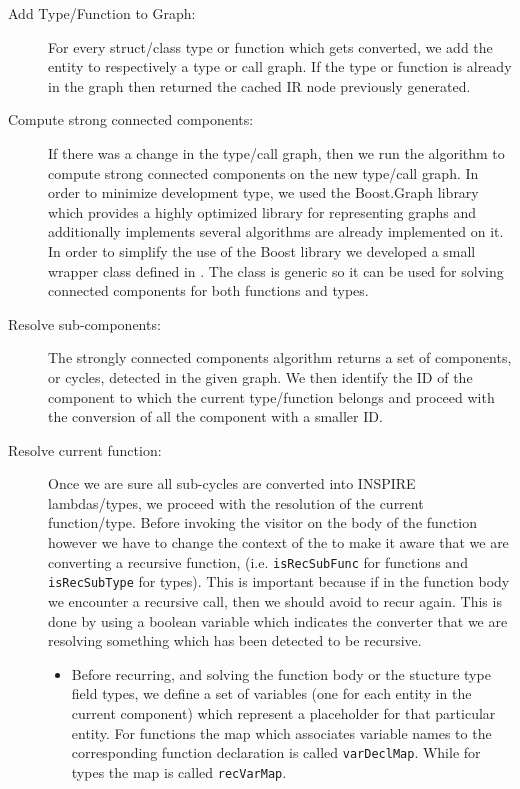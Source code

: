 \begin{description}

\item [Add Type/Function to Graph:] For every struct/class type or function
which gets converted, we add the entity to respectively a type or call graph. If
the type or function is already in the graph then returned the cached IR node
previously generated.

\item[Compute strong connected components:] If there was a change in the
type/call graph, then we run the algorithm to compute strong connected components
on the new type/call graph. In order to minimize development type, we used the
Boost.Graph library which provides a highly optimized library for representing
graphs and additionally implements several algorithms are already implemented on
it. In order to simplify the use of the Boost library we developed a small
wrapper class  defined in
. The class is generic so it can be used for
solving connected components for both functions and types. 

\item[Resolve sub-components:] The strongly connected components algorithm
returns a set of components, or cycles, detected in the given graph. We then
identify the ID of the component to which the current type/function belongs and
proceed with the conversion of all the component with a smaller ID. 

\item[Resolve current function:] Once we are sure all sub-cycles are converted
into INSPIRE lambdas/types, we proceed with the resolution of the current
function/type. Before invoking the visitor on the body of the function however
we have to change the context of the  to make
it aware that we are converting a recursive function, (i.e. {\tt isRecSubFunc}
for functions and {\tt isRecSubType} for types). This is important because
if in the function body we encounter a recursive call, then we should avoid to
recur again. This is done by using a boolean variable which indicates the
converter that we are resolving something which has been detected to be
recursive. 
\begin{itemize}

	\item Before recurring, and solving the function body or the stucture type
		field types, we define a set of variables (one for each entity in the
		current component) which represent a placeholder for that particular
		entity. For functions the map which associates variable names to the
		corresponding function declaration is called {\tt varDeclMap}. While for
		types the map is called {\tt recVarMap}.


\end{itemize}
\end{description}
